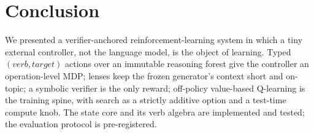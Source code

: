 \section{Conclusion}
\label{sec:conclusion}

We presented a verifier-anchored reinforcement-learning system in which a
tiny external controller, not the language model, is the object of
learning. Typed $(\textit{verb}, \textit{target})$ actions over an
immutable reasoning forest give the controller an operation-level MDP;
lenses keep the frozen generator's context short and on-topic; a symbolic
verifier is the only reward; off-policy value-based Q-learning is the
training spine, with search as a strictly additive option and a test-time
compute knob. The state core and its verb algebra are implemented and
tested; the evaluation protocol is pre-registered.
